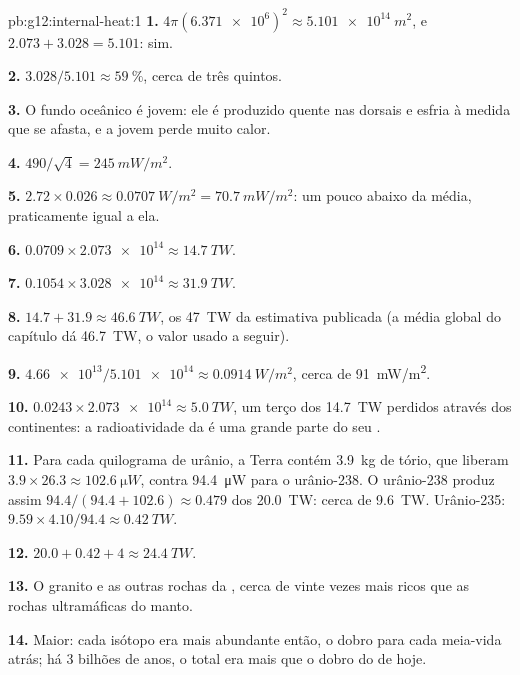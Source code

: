 \begin{solution}{pb:g12:internal-heat:1}
\textbf{1.} $4\pi (\num{6.371e6})^2 \approx \qty{5.101e14}{m^2}$, e
$2.073 + 3.028 = 5.101$: sim.

\textbf{2.} $3.028/5.101 \approx \qty{59}{\percent}$, cerca de três quintos.

\textbf{3.} O fundo oceânico é jovem: ele é produzido quente nas dorsais e
esfria à medida que se afasta, e a  jovem perde muito calor.

\textbf{4.} $490/\sqrt{4} = \qty{245}{mW/m^2}$.

\textbf{5.} $2.72 \times 0.026 \approx \qty{0.0707}{W/m^2} =
\qty{70.7}{mW/m^2}$: um pouco abaixo da média, praticamente igual a ela.

\textbf{6.} $0.0709 \times \num{2.073e14} \approx \qty{14.7}{TW}$.

\textbf{7.} $0.1054 \times \num{3.028e14} \approx \qty{31.9}{TW}$.

\textbf{8.} $14.7 + 31.9 \approx \qty{46.6}{TW}$, os \qty{47}{TW} da
estimativa publicada (a média global do capítulo dá \qty{46.7}{TW}, o valor
usado a seguir).

\textbf{9.} $\num{4.66e13}/\num{5.101e14} \approx \qty{0.0914}{W/m^2}$,
cerca de \qty{91}{mW/m^2}.

\textbf{10.} $0.0243 \times \num{2.073e14} \approx \qty{5.0}{TW}$, um terço
dos \qty{14.7}{TW} perdidos através dos continentes: a radioatividade da
 é uma grande parte do seu .

\textbf{11.} Para cada quilograma de urânio, a Terra contém \qty{3.9}{kg}
de tório, que liberam $3.9 \times 26.3 \approx \qty{102.6}{\micro W}$,
contra \qty{94.4}{\micro W} para o urânio-238. O urânio-238 produz assim
$94.4/(94.4 + 102.6) \approx 0.479$ dos \qty{20.0}{TW}: cerca de
\qty{9.6}{TW}. Urânio-235: $9.59 \times 4.10/94.4 \approx \qty{0.42}{TW}$.

\textbf{12.} $20.0 + 0.42 + 4 \approx \qty{24.4}{TW}$.

\textbf{13.} O granito e as outras rochas da , cerca de
vinte vezes mais ricos que as rochas ultramáficas do manto.

\textbf{14.} Maior: cada isótopo era mais abundante então, o dobro para cada
meia-vida atrás; há 3 bilhões de anos, o total era mais que o dobro do de
hoje.


\end{solution}
